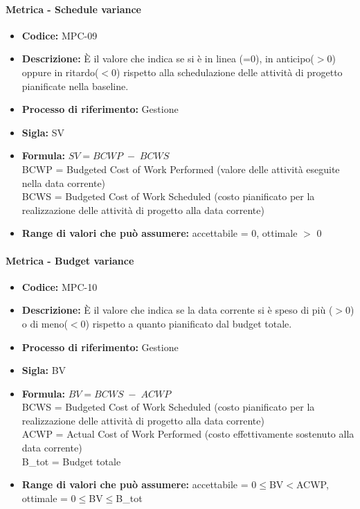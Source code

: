     \paragraph{Metrica - Schedule variance}
    \begin{itemize}
        \item \textbf{Codice:} MPC-09
        \item \textbf{Descrizione:} È il valore che indica se si è in linea (=0), in anticipo($>$0) oppure in ritardo($<$0) rispetto alla schedulazione delle attività di progetto pianificate nella baseline.
        \item \textbf{Processo di riferimento:} Gestione
        \item \textbf{Sigla:} SV
        \item \textbf{Formula:} \begin{math}{SV = {BCWP \; - \; BCWS}}\end{math} \\BCWP = Budgeted Cost of Work Performed (valore delle attività eseguite nella data corrente) \\BCWS = Budgeted Cost of Work Scheduled (costo pianificato per la realizzazione delle attività di progetto alla data corrente)
        \item \textbf{Range di valori che può assumere:} accettabile = 0, ottimale $>$ 0
    \end{itemize}

    \paragraph{Metrica - Budget variance}
        \begin{itemize}
            \item \textbf{Codice:} MPC-10 
            \item \textbf{Descrizione:} È il valore che indica se la data corrente si è speso di più ($>$0) o di meno($<$0) rispetto a quanto pianificato dal budget totale.
            \item \textbf{Processo di riferimento:} Gestione
            \item \textbf{Sigla:} BV
            \item \textbf{Formula:} \begin{math}{BV = {BCWS \; - \; ACWP}}\end{math} \\BCWS = Budgeted Cost of Work Scheduled (costo pianificato per la realizzazione delle attività di progetto alla data corrente) \\ACWP = Actual Cost of Work Performed (costo effettivamente sostenuto alla data corrente) \\B_tot = Budget totale
            \item \textbf{Range di valori che può assumere:} accettabile = 0$\leq$BV$<$ACWP, ottimale = 0$\leq$BV$\leq$B_tot
        \end{itemize}

